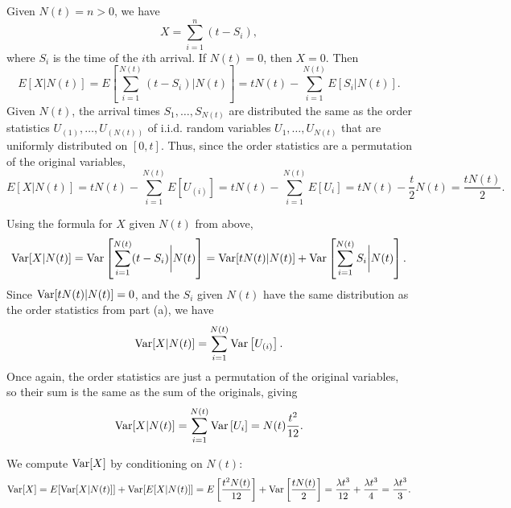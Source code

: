 \documentclass{homework}
\begin{document}
	\begin{alphaparts}
		\questionpart Given $N(t) = n>0$, we have
		\begin{equation*}
			X = \sum_{i=1}^n (t - S_i),
		\end{equation*}
		where $S_i$ is the time of the $i$th arrival. If $N(t) = 0$, then $X = 0$. Then
		\begin{equation*}
			E[X | N(t)] = E\left[\sum_{i=1}^{N(t)}(t-S_i) \bigg\vert N(t)\right] = tN(t) - \sum_{i=1}^{N(t)}E[S_i |N(t)].
		\end{equation*}
		Given $N(t)$, the arrival times $S_1, \dots, S_{N(t)}$ are distributed the same as the order statistics $U_{(1)}, \dots, U_{(N(t))}$ of i.i.d. random variables $U_1, \dots, U_{N(t)}$ that are uniformly distributed on $[0,t]$. Thus, since the order statistics are a permutation of the original variables,
		\begin{equation*}
			E[X |N(t)] = tN(t) - \sum_{i=1}^{N(t)}E[U_{(i)}] = tN(t) - \sum_{i=1}^{N(t)}E[U_i] = tN(t) - \frac{t}{2}N(t) = \frac{tN(t)}{2}.
		\end{equation*}
		
		\questionpart Using the formula for $X$ given $N(t)$ from above,
		\begin{equation*}
			\mathrm{Var}[X|N(t)] = \mathrm{Var}\left[\sum_{i=1}^{N(t)}(t-S_i) \bigg\vert N(t)\right] = \mathrm{Var}[tN(t) | N(t)] + \mathrm{Var}\left[\sum_{i=1}^{N(t)}S_i \bigg\vert N(t)\right].
		\end{equation*}
		Since $\mathrm{Var}[tN(t) |N(t)] = 0$, and the $S_i$ given $N(t)$ have the same distribution as the order statistics from part (a), we have
		\begin{equation*}
			\mathrm{Var}[X|N(t)] = \sum_{i=1}^{N(t)}\mathrm{Var}\left[U_{(i)}\right].
		\end{equation*} 
		Once again, the order statistics are just a permutation of the original variables, so their sum is the same as the sum of the originals, giving
		\begin{equation*}
			\mathrm{Var}[X|N(t)] = \sum_{i=1}^{N(t)}\mathrm{Var}\left[U_i\right] = N(t)\frac{t^2}{12}.
		\end{equation*}
		
		\questionpart We compute $\mathrm{Var}[X]$ by conditioning on $N(t)$:
		\begin{equation*}
			\mathrm{Var}[X] = E[\mathrm{Var}[X |N(t)]] + \mathrm{Var}[E[X|N(t)]] = E\left[\frac{t^2N(t)}{12}\right] + \mathrm{Var}\left[\frac{tN(t)}{2}\right] = \frac{\lambda t^3}{12} + \frac{\lambda t^3}{4} = \frac{\lambda t^3}{3}.
		\end{equation*}
	\end{alphaparts}
	
\end{document}
